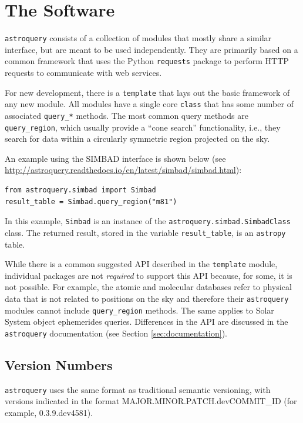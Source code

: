 \documentclass[twocolumn]{aastex61}
\newcommand{\package}[1]{\texttt{#1}\xspace}
\newcommand{\astroquery}{\package{astroquery}}
\newcommand{\astropypkg}{\package{astropy}}
\begin{document}
\section{The Software}
\label{sec:software}
\astroquery consists of a collection of modules that mostly share a similar
interface, but are meant to be used independently.  They are primarily based on
a common framework that uses the Python \package{requests} package to perform
HTTP requests to communicate with web services.

For new development, there is a \texttt{template}  that lays out the basic
framework of any new module.  All modules have a single core
\texttt{class} that has some number of associated \texttt{query\_*} methods.
The most common query methods are \texttt{query\_region}, which usually provide
a ``cone search'' functionality, i.e., they search for data within a circularly
symmetric region projected on the sky.

An example using the SIMBAD interface is shown below (see
\url{http://astroquery.readthedocs.io/en/latest/simbad/simbad.html}):
\begin{lstlisting}[caption=Query SIMBAD for a region around M81]
from astroquery.simbad import Simbad
result_table = Simbad.query_region("m81")
\end{lstlisting}
In this example, \texttt{Simbad} is an instance of the
\texttt{astroquery.simbad.SimbadClass} class.
The returned result, stored in the variable \texttt{result\_table},
is an \astropypkg table.

While there is a common suggested API described in the \texttt{template} module,
individual packages are not \emph{required} to support this API because, for
some, it is not possible.  For example, the atomic and molecular databases refer
to physical data that is not related to positions on the sky and therefore
their \astroquery modules cannot include \texttt{query\_region} methods. The same applies to Solar System object ephemerides queries. Differences in the API are discussed in the \astroquery documentation (see Section \ref{sec:documentation}).

\subsection{Version Numbers}
\label{sec:versionnumbers}
\astroquery uses the same format as traditional semantic versioning,
with versions indicated in the format MAJOR.MINOR.PATCH.devCOMMIT\_ID (for
example, 0.3.9.dev4581).  
\end{document}
